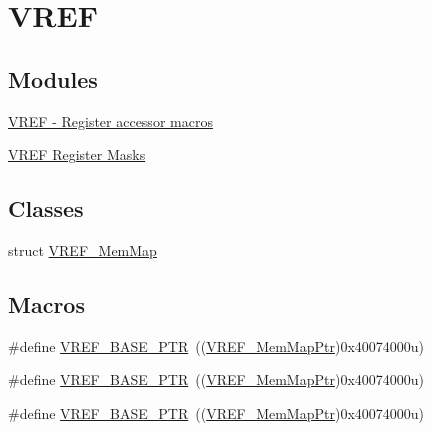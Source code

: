\hypertarget{group___v_r_e_f___peripheral}{}\section{V\+R\+EF}
\label{group___v_r_e_f___peripheral}
\subsection*{Modules}
\begin{DoxyCompactItemize}
\item 
\hyperlink{group___v_r_e_f___register___accessor___macros}{V\+R\+E\+F -\/ Register accessor macros}
\item 
\hyperlink{group___v_r_e_f___register___masks}{V\+R\+E\+F Register Masks}
\end{DoxyCompactItemize}
\subsection*{Classes}
\begin{DoxyCompactItemize}
\item 
struct \hyperlink{struct_v_r_e_f___mem_map}{V\+R\+E\+F\+\_\+\+Mem\+Map}
\end{DoxyCompactItemize}
\subsection*{Macros}
\begin{DoxyCompactItemize}
\item 
\#define \hyperlink{group___v_r_e_f___peripheral_ga53dba79dbefcdd6f788740a6d0caa57d}{V\+R\+E\+F\+\_\+\+B\+A\+S\+E\+\_\+\+P\+TR}~((\hyperlink{group___v_r_e_f___peripheral_ga0730b01086e1d40975ad4e6c1d101b7c}{V\+R\+E\+F\+\_\+\+Mem\+Map\+Ptr})0x40074000u)
\item 
\#define \hyperlink{group___v_r_e_f___peripheral_ga53dba79dbefcdd6f788740a6d0caa57d}{V\+R\+E\+F\+\_\+\+B\+A\+S\+E\+\_\+\+P\+TR}~((\hyperlink{group___v_r_e_f___peripheral_ga0730b01086e1d40975ad4e6c1d101b7c}{V\+R\+E\+F\+\_\+\+Mem\+Map\+Ptr})0x40074000u)
\item 
\#define \hyperlink{group___v_r_e_f___peripheral_ga53dba79dbefcdd6f788740a6d0caa57d}{V\+R\+E\+F\+\_\+\+B\+A\+S\+E\+\_\+\+P\+TR}~((\hyperlink{group___v_r_e_f___peripheral_ga0730b01086e1d40975ad4e6c1d101b7c}{V\+R\+E\+F\+\_\+\+Mem\+Map\+Ptr})0x40074000u)
\end{DoxyCompactItemize}
